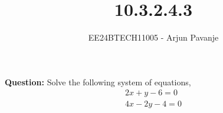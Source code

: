 \documentclass[journal]{IEEEtran}
\begin{document}

\vspace{3cm}

\title{10.3.2.4.3}
\author{EE24BTECH11005 - Arjun Pavanje}
{\let\newpage\relax\maketitle}
\textbf{Question:}
Solve the following system of equations,
\begin{align}
  2x + y - 6 = 0\\
  4x - 2y - 4 = 0
\end{align}

\solution \newline
\end{document}
